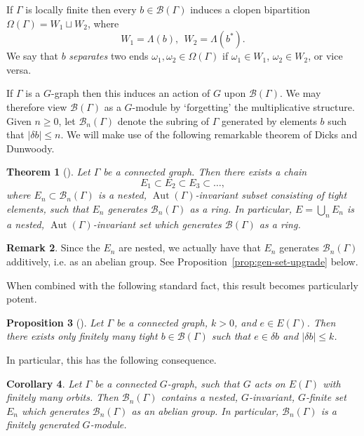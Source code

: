 \documentclass[11pt,a4paper]{amsart}
\DeclareMathOperator{\Aut}{Aut}
\newtheorem{theorem}{Theorem}[section]%
\newtheorem{proposition}[theorem]{Proposition}
\newtheorem{corollary}[theorem]{Corollary}
\theoremstyle{definition}
\newtheorem{remark}[theorem]{Remark}
\newcommand{\br}{{\mathscr{B}}}
\begin{document}
If $\Gamma$ is locally finite then every $b \in \br(\Gamma)$ induces a clopen bipartition $\Omega(\Gamma) = W_1 \sqcup W_2$, where
$$
W_1 = \Lambda(b), \ \ W_2 = \Lambda(b^\ast).
$$
We say that $b$ \emph{separates} two ends $\omega_1, \omega_2 \in \Omega(\Gamma)$ if $\omega_1 \in W_1$, $\omega_2 \in W_2$, or vice versa. 

If $\Gamma$ is a $G$-graph then this induces an action of $G$ upon $\br (\Gamma)$. We may therefore view $\br (\Gamma)$ as a $G$-module by `forgetting' the multiplicative structure. 
Given $n \geq 0$, let
$
\br_n(\Gamma)
$
denote the subring of $\Gamma$ generated by elements $b$ such that $|\delta b| \leq n$. We will make use of the following remarkable theorem of Dicks and Dunwoody.


\begin{theorem}[{\cite[Thm.~II.2.20]{dicks1989groups}}]\label{thm:dicks-dunwoody}
    Let $\Gamma$ be a connected graph. Then there exists a chain 
    $$
    E_1 \subset E_2 \subset E_3 \subset \ldots,
    $$
    where $E_n \subset \br_n(\Gamma)$ is a nested, $\Aut(\Gamma)$-invariant subset consisting of tight elements, such that $E_n$ generates $\br_n(\Gamma)$ as a ring. 
    In particular, $E = \bigcup_n E_n$ is a nested, $\Aut(\Gamma)$-invariant set which generates $\br(\Gamma)$ as a ring. 
\end{theorem}

\begin{remark}
    Since the $E_n$ are nested, we actually have that $E_n$ generates $\br_n(\Gamma)$ additively, i.e. as an abelian group. See Proposition~\ref{prop:gen-set-upgrade} below. 
\end{remark}

When combined with the following standard fact, this result becomes particularly potent. 

\begin{proposition}[{\cite[Prop.~4.1]{thomassen1993vertex}}]
    Let $\Gamma$ be a connected graph, $k > 0$, and $e \in E(\Gamma)$. Then there exists only finitely many tight $b \in \br(\Gamma)$ such that $e \in \delta b$ and $|\delta b| \leq k$. 
\end{proposition}

In particular, this has the following consequence. 
\begin{corollary}\label{cor:dicks-dunwoody-gfinite}
    Let $\Gamma$ be a connected $G$-graph, such that $G$ acts on $E(\Gamma)$ with finitely many orbits. Then $\br_n(\Gamma)$ contains a nested, $G$-invariant, $G$-finite set $E_n$ which generates $\br_n(\Gamma)$ as an abelian group. In particular, $\br_n(\Gamma)$ is a finitely generated $G$-module. 
\end{corollary}
\end{document}
